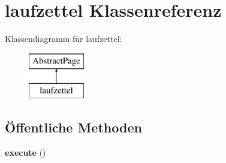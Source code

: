 \hypertarget{classlaufzettel}{}\section{laufzettel Klassenreferenz}
\label{classlaufzettel}
Klassendiagramm für laufzettel\+:\begin{figure}[H]
\begin{center}
\leavevmode
\includegraphics[height=2.000000cm]{classlaufzettel}
\end{center}
\end{figure}
\subsection*{Öffentliche Methoden}
\begin{DoxyCompactItemize}
\item 
\mbox{\label{classlaufzettel_a00b7ec90b643c021493c2389d1d262b6}} 
{\bfseries execute} ()
\end{DoxyCompactItemize}
